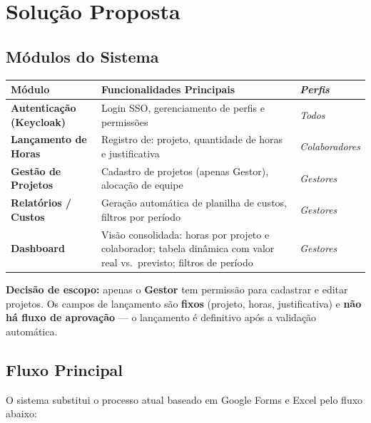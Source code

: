 \documentclass[12pt,a4paper]{article}
\begin{document}
\section{Solução Proposta}

\subsection{Módulos do Sistema}

\begin{tabularx}{\linewidth}{>{\bfseries}lX>{\itshape}l}
  \toprule
  Módulo & Funcionalidades Principais & Perfis \\
  \midrule
  Autenticação (Keycloak) & Login SSO, gerenciamento de perfis e permissões & Todos \\[4pt]
  Lançamento de Horas     & Registro de: projeto, quantidade de horas e justificativa & Colaboradores \\[4pt]
  Gestão de Projetos      & Cadastro de projetos (apenas Gestor), alocação de equipe & Gestores \\[4pt]
  Relatórios / Custos     & Geração automática de planilha de custos, filtros por período & Gestores \\[4pt]
  Dashboard               & Visão consolidada: horas por projeto e colaborador; tabela dinâmica com valor real vs.\ previsto; filtros de período & Gestores \\
  \bottomrule
\end{tabularx}

\vspace{0.6em}
\begin{caixaazul}
  \textbf{Decisão de escopo:} apenas o \textbf{Gestor} tem permissão para cadastrar e editar
  projetos. Os campos de lançamento são \textbf{fixos} (projeto, horas, justificativa) e
  \textbf{não há fluxo de aprovação} — o lançamento é definitivo após a validação automática.
\end{caixaazul}

\subsection{Fluxo Principal}

O sistema substitui o processo atual baseado em Google Forms e Excel pelo fluxo abaixo:
\end{document}
